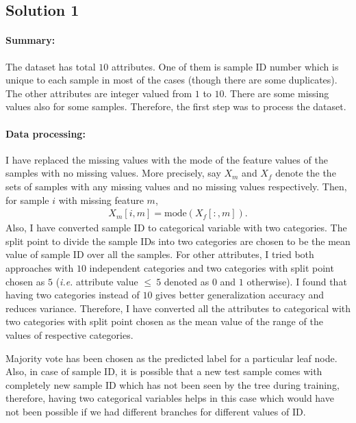 \subsection*{Solution 1}
\paragraph{Summary:} The dataset has total $10$ attributes. One of them is sample ID number which is unique to each sample in most of the cases (though there are some duplicates). The other attributes are integer valued from $1$ to $10$. There are some missing values also for some samples. Therefore, the first step was to process the dataset.
\paragraph{Data processing:} I have replaced the missing values with the mode of the feature values of the samples with no missing values. More precisely, say $X_m$ and $X_f$ denote the the sets of samples with any missing values and no missing values respectively. Then, for sample $i$ with missing feature $m$,
\begin{align*}
	X_m[i, m] = \text{mode}(X_f[:, m]).
\end{align*}
Also, I have converted sample ID to categorical variable with two categories. The split point to divide the sample IDs into two categories are chosen to be the mean value of sample ID over all the samples. For other attributes, I tried both approaches with $10$ independent categories and two categories with split point chosen as $5$ (\textit{i.e.} attribute value $\leq\ 5$ denoted as $0$ and $1$ otherwise). I found that having two categories instead of $10$ gives better generalization accuracy and reduces variance. Therefore, I have converted all the attributes to categorical with two categories with split point chosen as the mean value of the range of the values of respective categories.

Majority vote has been chosen as the predicted label for a particular leaf node. Also, in case of sample ID, it is possible that a new test sample comes with completely new sample ID which has not been seen by the tree during training, therefore, having two categorical variables helps in this case which would have not been possible if we had different branches for different values of ID.

